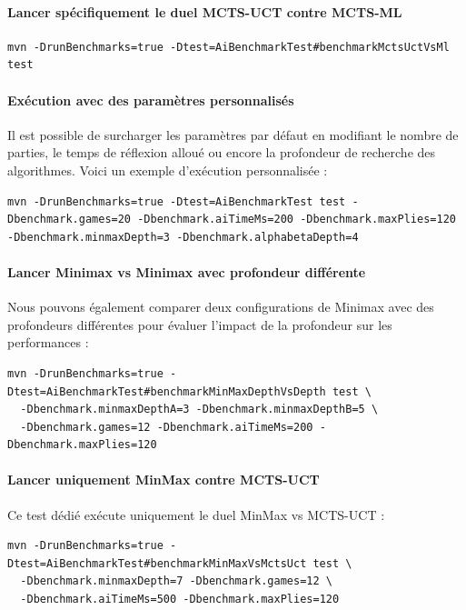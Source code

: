 \documentclass[a4paper]{article}
\begin{document}
\paragraph{Lancer spécifiquement le duel MCTS-UCT contre MCTS-ML}
\begin{verbatim}
mvn -DrunBenchmarks=true -Dtest=AiBenchmarkTest#benchmarkMctsUctVsMl test
\end{verbatim}

\paragraph{Exécution avec des paramètres personnalisés}
Il est possible de surcharger les paramètres par défaut en modifiant le nombre de parties, le temps de réflexion alloué ou 
encore la profondeur de recherche des algorithmes. Voici un exemple d'exécution personnalisée :
\begin{verbatim}
mvn -DrunBenchmarks=true -Dtest=AiBenchmarkTest test -Dbenchmark.games=20 -Dbenchmark.aiTimeMs=200 -Dbenchmark.maxPlies=120 -Dbenchmark.minmaxDepth=3 -Dbenchmark.alphabetaDepth=4
\end{verbatim}

\paragraph{Lancer Minimax vs Minimax avec profondeur différente}
Nous pouvons également comparer deux configurations de Minimax avec des profondeurs différentes pour évaluer l'impact de 
la profondeur sur les performances :
\begin{verbatim}
mvn -DrunBenchmarks=true -Dtest=AiBenchmarkTest#benchmarkMinMaxDepthVsDepth test \
  -Dbenchmark.minmaxDepthA=3 -Dbenchmark.minmaxDepthB=5 \
  -Dbenchmark.games=12 -Dbenchmark.aiTimeMs=200 -Dbenchmark.maxPlies=120
\end{verbatim}

\paragraph{Lancer uniquement MinMax contre MCTS-UCT}
Ce test dédié exécute uniquement le duel MinMax vs MCTS-UCT :
\begin{verbatim}
mvn -DrunBenchmarks=true -Dtest=AiBenchmarkTest#benchmarkMinMaxVsMctsUct test \
  -Dbenchmark.minmaxDepth=7 -Dbenchmark.games=12 \
  -Dbenchmark.aiTimeMs=500 -Dbenchmark.maxPlies=120
\end{verbatim}
\end{document}
